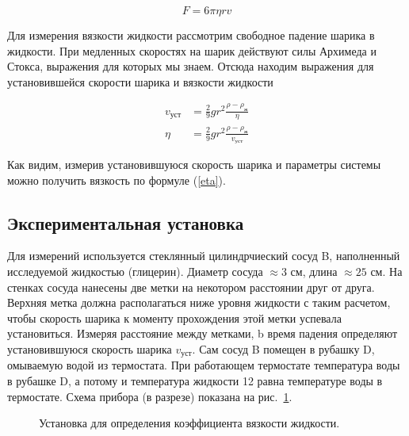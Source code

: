 \documentclass[a4paper, 12pt]{article}
\begin{document}
    \begin{equation}\label{stokes}
        F = 6\pi\eta rv
    \end{equation}


    Для измерения вязкости жидкости рассмотрим свободное падение шарика в жидкости. При медленных скоростях на шарик действуют силы Архимеда и Стокса, выражения для которых мы знаем. Отсюда находим выражения для установившейся скорости шарика и вязкости жидкости

        \begin{align}
            v_{уст}&=\frac{2}{9}gr^2\frac{\rho - \rho_ж}{\eta}\label{v_ust}\\
            \eta&=\frac{2}{9}gr^2\frac{\rho - \rho_ж}{v_{уст}}\label{eta}
        \end{align}

    Как видим, измерив установившуюся скорость шарика и параметры системы можно получить вязкость по формуле (\ref{eta}).

    \subsection{Экспериментальная установка}
    Для измерений используется стеклянный цилиндрчиеский сосуд B, наполненный исследуемой жидкостью (глицерин). Диаметр сосуда $\approx 3$ см, длина $\approx 25$ см. На стенках сосуда нанесены две метки на некотором расстоянии друг от друга. Верхняя метка должна располагаться ниже уровня жидкости с таким расчетом, чтобы скорость шарика к моменту прохождения этой метки успевала установиться. Измеряя расстояние между метками, b время падения определяют установившуюся скорость шарика $v_{уст}$. Сам сосуд B помещен в рубашку D, омываемую водой из термостата. При работающем термостате температура воды в рубашке D, а потому и температура жидкости 12 равна температуре воды в термостате.
    Схема прибора (в разрезе) показана на рис.~\ref{ustanovka}.
    \begin{figure}[h]
        \caption{Установка для определения коэффициента вязкости жидкости.}
        \label{ustanovka}
    \end{figure}
\end{document}
